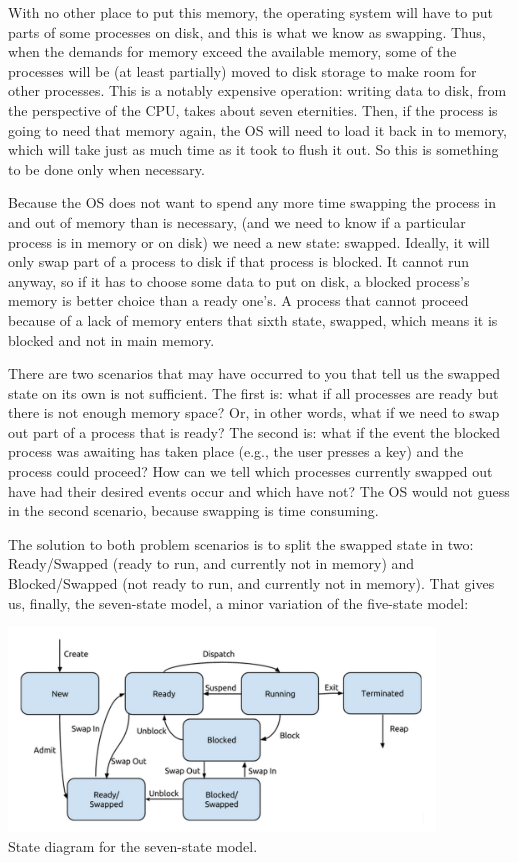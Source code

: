 With no other place to put this memory, the operating system will have to put parts of some processes on disk, and this is what we know as swapping. Thus, when the demands for memory exceed the available memory, some of the processes will be (at least partially) moved to disk storage to make room for other processes. This is a notably expensive operation: writing data to disk, from the perspective of the CPU, takes about seven eternities. Then, if the process is going to need that memory again, the OS will need to load it back in to memory, which will take just as much time as it took to flush it out. So this is something to be done only when necessary.

Because the OS does not want to spend any more time swapping the process in and out of memory than is necessary, (and we need to know if a particular process is in memory or on disk) we need a new state: swapped.  Ideally, it will only swap part of a process to disk if that process is blocked. It cannot run anyway, so if it has to choose some data to put on disk, a blocked process's memory is better choice than a ready one's. A process that cannot proceed because of a lack of memory enters that sixth state, swapped, which means it is blocked and not in main memory.

There are two scenarios that may have occurred to you that tell us the swapped state on its own is not sufficient. The first is: what if all processes are ready but there is not enough memory space? Or, in other words, what if we need to swap out part of a process that is ready? The second is: what if the event the blocked process was awaiting has taken place (e.g., the user presses a key) and the process could proceed? How can we tell which processes currently swapped out have had their desired events occur and which have not? The OS would not guess in the second scenario, because swapping is time consuming.

The solution to both problem scenarios is to split the swapped state in two: Ready/Swapped (ready to run, and currently not in memory) and Blocked/Swapped (not ready to run, and currently not in memory). That gives us, finally, the seven-state model, a minor variation of the five-state model:

\begin{center}
	\includegraphics[width=0.85\textwidth]{images/7-state-model.png}\\
	State diagram for the seven-state model.
\end{center}


